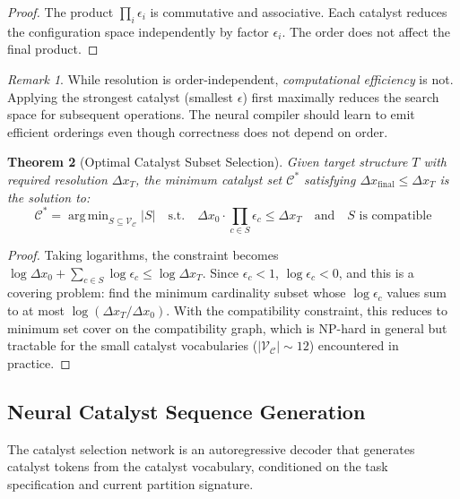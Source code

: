 \documentclass[11pt,twocolumn,a4paper]{article}
\newtheorem{theorem}{Theorem}[section]
\theoremstyle{definition}
\theoremstyle{remark}
\newtheorem{remark}[theorem]{Remark}
\DeclareMathOperator*{\argmin}{arg\,min}
\newcommand{\catalyst}{\mathcal{C}}
\newcommand{\vocab}{\mathcal{V}}
\begin{document}
\begin{proof}
The product $\prod_i \epsilon_i$ is commutative and associative. Each catalyst reduces the configuration space independently by factor $\epsilon_i$. The order does not affect the final product.
\end{proof}

\begin{remark}
While resolution is order-independent, \emph{computational efficiency} is not. Applying the strongest catalyst (smallest $\epsilon$) first maximally reduces the search space for subsequent operations. The neural compiler should learn to emit efficient orderings even though correctness does not depend on order.
\end{remark}

\begin{theorem}[Optimal Catalyst Subset Selection]
\label{thm:optimal_subset}
Given target structure $T$ with required resolution $\Delta x_T$, the minimum catalyst set $\mathcal{C}^*$ satisfying $\Delta x_{\mathrm{final}} \leq \Delta x_T$ is the solution to:
\begin{equation}
\mathcal{C}^* = \argmin_{S \subseteq \vocab_\catalyst} |S| \quad \text{s.t.} \quad \Delta x_0 \cdot \prod_{c \in S} \epsilon_c \leq \Delta x_T \quad \text{and} \quad S \text{ is compatible}
\end{equation}
\end{theorem}

\begin{proof}
Taking logarithms, the constraint becomes $\log \Delta x_0 + \sum_{c \in S} \log \epsilon_c \leq \log \Delta x_T$. Since $\epsilon_c < 1$, $\log \epsilon_c < 0$, and this is a covering problem: find the minimum cardinality subset whose $\log \epsilon_c$ values sum to at most $\log(\Delta x_T / \Delta x_0)$. With the compatibility constraint, this reduces to minimum set cover on the compatibility graph, which is NP-hard in general but tractable for the small catalyst vocabularies ($|\vocab_\catalyst| \sim 12$) encountered in practice.
\end{proof}

\subsection{Neural Catalyst Sequence Generation}

The catalyst selection network is an autoregressive decoder that generates catalyst tokens from the catalyst vocabulary, conditioned on the task specification and current partition signature.
\end{document}

